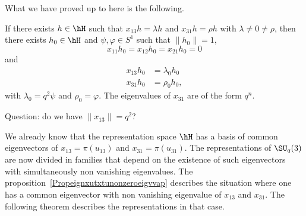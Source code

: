 What we have proved up to here is the following.
\begin{proposition}     \label{Propeignxutxtunonzeroeigvvap}
	If there exists \( h\in\hH\) such that \( x_{13}h=\lambda h\) and \( x_{31}h=\rho h\) with \( \lambda\neq 0\neq \rho\), then there exists \( h_0\in\hH\) and \( \psi,\varphi\in S^1\) such that \( \| h_0\|=1 \),
	\begin{equation}
		x_{11}h_0=x_{12}h_0=x_{21}h_0=0
	\end{equation}
	and
	\begin{subequations}
		\begin{align}
			x_{13}h_0 & =\lambda_0h_0 \\
			x_{31}h_0 & =\rho_0 h_0,
		\end{align}
	\end{subequations}
	with \( \lambda_0=q^2\psi\) and \( \rho_0=\varphi\). The eigenvalues of \( x_{31}\) are of the form \( q^n\).
\end{proposition}

\begin{probleme}
	Question: do we have \( \| x_{13} \|=q^2\)?
\end{probleme}

We already know that the representation space \( \hH\) has a basis of common eigenvectors of \( x_{13}=\pi(u_{13})\) and \( x_{31}=\pi(u_{31})\). The representations of \( \SU_q(3)\) are now divided in families that depend on the existence of such eigenvectors with simultaneously non vanishing eigenvalues. The proposition~\ref{Propeignxutxtunonzeroeigvvap} describes the situation where one has a common eigenvector with non vanishing eigenvalue of \( x_{13}\) and \( x_{31}\). The following theorem describes the representations in that case.

